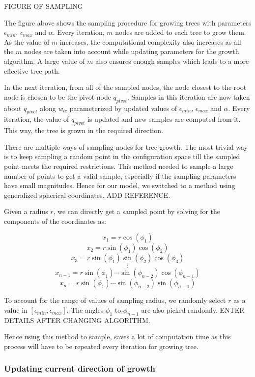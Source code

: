 \documentclass[fleqn]{article}
\begin{document}
	FIGURE OF SAMPLING
	
	The figure above shows the sampling procedure for growing trees with parameters $\epsilon_{min}$, $\epsilon_{max}$ and $\alpha$. Every iteration, $m$ nodes are added to each tree to grow them. As the value of $m$ increases, the computational complexity also increases as all the $m$ nodes are taken into account while updating parameters for the growth algorithm. A large value of $m$ also ensures enough samples which leads to a more effective tree path.
	
	In the next iteration, from all of the sampled nodes, the node closest to the root node is chosen to be the pivot node $q_{pivot}$. Samples in this iteration are now taken about $q_{pivot}$ along $w_{tc}$ parameterized by updated values of $\epsilon_{min}$, $\epsilon_{max}$ and $\alpha$. Every iteration, the value of $q_{pivot}$ is updated and new samples are computed from it. This way, the tree is grown in the required direction.
	
	There are multiple ways of sampling nodes for tree growth. The most trivial way is to keep sampling a random point in the configuration space till the sampled point meets the required restrictions. This method needed to sample a large number of points to get a valid sample, especially if the sampling parameters have small magnitudes. Hence for our model, we switched to a method using generalized spherical coordinates. ADD REFERENCE.
	
	Given a radius $r$, we can directly get a sampled point by solving for the components of the coordinates as:
	
	\[x_1 = r\cos(\phi_1)\]
	\[x_2 = r\sin(\phi_1)\cos(\phi_2)\]
	\[x_3 = r\sin(\phi_1)\sin(\phi_2)\cos(\phi_3)\]
	\[\vdots\]
	\[x_{n-1} = r\sin(\phi_1)\cdots\sin(\phi_{n-2})\cos(\phi_{n-1})\]
	\[x_n = r\sin(\phi_1)\cdots\sin(\phi_{n-2})\sin(\phi_{n-1})\]
	
	To account for the range of values of sampling radius, we randomly select $r$ as a value in $[\epsilon_{min}, \epsilon_{max}]$. The angles $\phi_1$ to $\phi_{n-1}$ are also picked randomly. ENTER DETAILS AFTER CHANGING ALGORITHM. 
	
	Hence using this method to sample, saves a lot of computation time as this process will have to be repeated every iteration for growing tree.
	
	\subsubsection{Updating current direction of growth}
	
\end{document}
